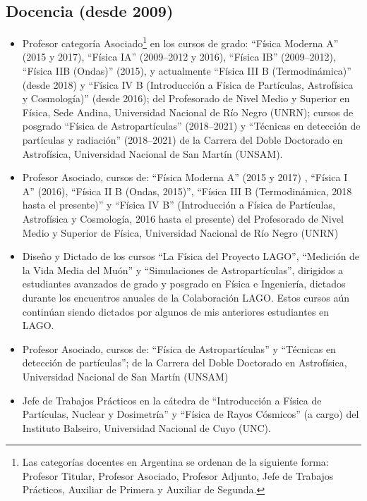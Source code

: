 \subsection*{Docencia (desde 2009)}
\begin{itemize}
\ifres
	\item Profesor categoría Asociado\footnote{Las categorías docentes en Argentina se ordenan de la siguiente forma: Profesor Titular, Profesor Asociado, Profesor Adjunto, Jefe de Trabajos Prácticos, Auxiliar de Primera y Auxiliar de Segunda.} en los cursos de grado: ``Física Moderna A'' (2015 y 2017), ``Física IA'' (2009--2012 y 2016), ``Física IB'' (2009--2012), ``Física IIB (Ondas)'' (2015), y actualmente ``Física III B (Termodinámica)'' (desde 2018) y ``Física IV B (Introducción a Física de Partículas, Astrofísica y Cosmología)'' (desde 2016); del Profesorado de Nivel Medio y Superior en Física, Sede Andina, Universidad Nacional de Río Negro (UNRN); cursos de posgrado ``Física de Astropartículas'' (2018--2021) y ``Técnicas en detección de partículas y radiación'' (2018--2021) de la Carrera del Doble Doctorado en Astrofísica, Universidad Nacional de San Martín (UNSAM).
\else
	\item {} Profesor Asociado, cursos de: ``Física Moderna A'' (2015 y 2017) , ``Física I A'' (2016), ``Física II B (Ondas, 2015)'', ``Física III B (Termodinámica, 2018 hasta el presente)'' y ``Física IV B'' (Introducción a Física de Partículas, Astrofísica y Cosmología, 2016 hasta el presente) del Profesorado de Nivel Medio y Superior de Física, Universidad Nacional de Río Negro (UNRN)
	\item {} Diseño y Dictado de los cursos ``La Física del Proyecto LAGO'', ``Medición de la Vida Media del Muón'' y ``Simulaciones de Astropartículas'', dirigidos a estudiantes avanzados de grado y posgrado en Física e Ingeniería, dictados durante los encuentros anuales de la Colaboración LAGO. Estos cursos aún continúan siendo dictados por algunos de mis anteriores estudiantes en LAGO\@.
	\item {} Profesor Asociado, cursos de: ``Física de Astropartículas'' y ``Técnicas en detección de partículas'';
	de la Carrera del Doble Doctorado en Astrofísica, Universidad Nacional de San Martín (UNSAM)
 	\item {} Jefe de Trabajos Prácticos en la cátedra de ``Introducción a Física de Partículas, Nuclear y Dosimetría'' y ``Física de Rayos Cósmicos'' (a cargo) del Instituto Balseiro, Universidad Nacional de Cuyo (UNC).

\end{itemize}
